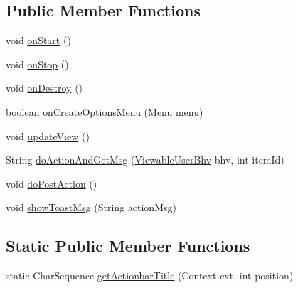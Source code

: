 \subsection*{\-Public \-Member \-Functions}
\begin{DoxyCompactItemize}
\item 
void \hyperlink{classlab_1_1davidahn_1_1appshuttle_1_1view_1_1ui_1_1_app_shuttle_main_activity_a06633cdaa4e1040416ed8d1cfc4ba1be}{on\-Start} ()
\item 
void \hyperlink{classlab_1_1davidahn_1_1appshuttle_1_1view_1_1ui_1_1_app_shuttle_main_activity_a692aed49f89123f4da12fad9c0ad3dcd}{on\-Stop} ()
\item 
void \hyperlink{classlab_1_1davidahn_1_1appshuttle_1_1view_1_1ui_1_1_app_shuttle_main_activity_a46882acdeb38dd86c18770057abb7328}{on\-Destroy} ()
\item 
boolean \hyperlink{classlab_1_1davidahn_1_1appshuttle_1_1view_1_1ui_1_1_app_shuttle_main_activity_ab15800e9db05b549eb74596a2bcd1a07}{on\-Create\-Options\-Menu} (\-Menu menu)
\item 
void \hyperlink{classlab_1_1davidahn_1_1appshuttle_1_1view_1_1ui_1_1_app_shuttle_main_activity_a1f734cabe1bd235485ba1d66865a8eb8}{update\-View} ()
\item 
\-String \hyperlink{classlab_1_1davidahn_1_1appshuttle_1_1view_1_1ui_1_1_app_shuttle_main_activity_a89208de0a4ba1cb488208b72f9aa33ee}{do\-Action\-And\-Get\-Msg} (\hyperlink{classlab_1_1davidahn_1_1appshuttle_1_1view_1_1_viewable_user_bhv}{\-Viewable\-User\-Bhv} bhv, int item\-Id)
\item 
void \hyperlink{classlab_1_1davidahn_1_1appshuttle_1_1view_1_1ui_1_1_app_shuttle_main_activity_ac3c73287e96ee57939e18ef7331bd02a}{do\-Post\-Action} ()
\item 
void \hyperlink{classlab_1_1davidahn_1_1appshuttle_1_1view_1_1ui_1_1_app_shuttle_main_activity_a55489de149b3d1de450da65bcf894757}{show\-Toast\-Msg} (\-String action\-Msg)
\end{DoxyCompactItemize}
\subsection*{\-Static \-Public \-Member \-Functions}
\begin{DoxyCompactItemize}
\item 
static \-Char\-Sequence \hyperlink{classlab_1_1davidahn_1_1appshuttle_1_1view_1_1ui_1_1_app_shuttle_main_activity_ae8417f8cc4ccf77897e8a6fb76a8541b}{get\-Actionbar\-Title} (\-Context cxt, int position)
\end{DoxyCompactItemize}

